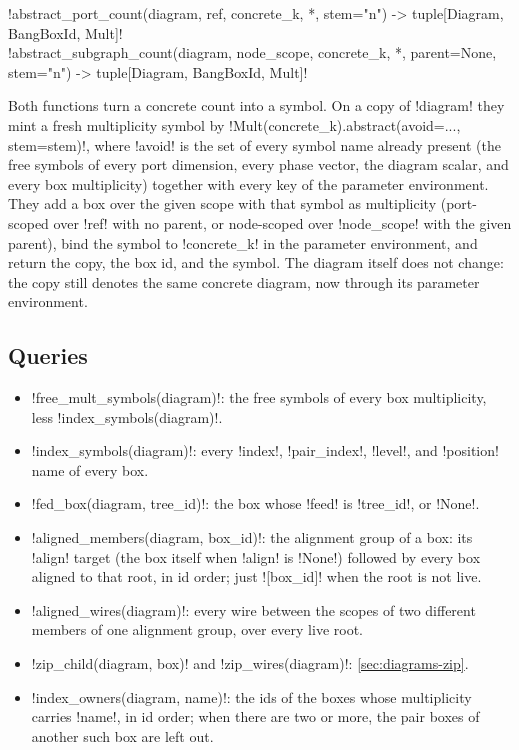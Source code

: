 \begin{signature}
\py!abstract_port_count(diagram, ref, concrete_k, *, stem="n") -> tuple[Diagram, BangBoxId, Mult]!\\
\py!abstract_subgraph_count(diagram, node_scope, concrete_k, *, parent=None, stem="n") -> tuple[Diagram, BangBoxId, Mult]!
\end{signature}

Both functions turn a concrete count into a symbol. On a copy of \py!diagram! they mint a fresh multiplicity symbol by \py!Mult(concrete_k).abstract(avoid=..., stem=stem)!, where \py!avoid! is the set of every symbol name already present (the free symbols of every port dimension, every phase vector, the diagram scalar, and every box multiplicity) together with every key of the parameter environment. They add a box over the given scope with that symbol as multiplicity (port-scoped over \py!{ref}! with no parent, or node-scoped over \py!node_scope! with the given parent), bind the symbol to \py!concrete_k! in the parameter environment, and return the copy, the box id, and the symbol. The diagram itself does not change: the copy still denotes the same concrete diagram, now through its parameter environment.

\subsection{Queries}

\begin{itemize}
\item \py!free_mult_symbols(diagram)!: the free symbols of every box multiplicity, less \py!index_symbols(diagram)!.
\item \py!index_symbols(diagram)!: every \py!index!, \py!pair_index!, \py!level!, and \py!position! name of every box.
\item \py!fed_box(diagram, tree_id)!: the box whose \py!feed! is \py!tree_id!, or \py!None!.
\item \py!aligned_members(diagram, box_id)!: the alignment group of a box: its \py!align! target (the box itself when \py!align! is \py!None!) followed by every box aligned to that root, in id order; just \py![box_id]! when the root is not live.
\item \py!aligned_wires(diagram)!: every wire between the scopes of two different members of one alignment group, over every live root.
\item \py!zip_child(diagram, box)! and \py!zip_wires(diagram)!: \cref{sec:diagrams-zip}.
\item \py!index_owners(diagram, name)!: the ids of the boxes whose multiplicity carries \py!name!, in id order; when there are two or more, the pair boxes of another such box are left out.
\end{itemize}

